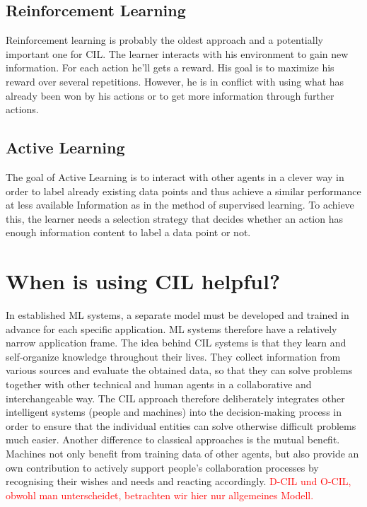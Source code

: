 \documentclass[conference,compsoc]{IEEEtran}
\newcommand\notes[1]{\textcolor{red}{#1}}
\begin{document}
\subsection{Reinforcement Learning}\label{reinforcement}
Reinforcement learning is probably the oldest approach and a potentially important one for CIL\@. 
The learner interacts with his environment to gain new information. For each action 
he'll gets a reward. His goal is to maximize his reward over several repetitions. 
However, he is in conflict with using what has already been won by his actions 
or to get more information through further actions.

\subsection{Active Learning}\label{active}
The goal of Active Learning is to interact with other agents in a clever way in order 
to label already existing data points and thus achieve a similar performance at less available 
Information as in the method of supervised learning. To achieve this, 
the learner needs a selection strategy\cite{ActiveToDedicated:calma} that decides whether 
an action has enough information content to label a data point or not.


\section{When is using CIL helpful?}\label{AdvantageOfCIL}
In established ML systems, a separate model must be developed and trained in advance for 
each specific application. ML systems therefore have a relatively narrow application frame. 
The idea behind CIL systems is that they learn and self-organize knowledge throughout their lives. 
They collect information from various sources and evaluate the obtained data, so that they 
can solve problems together with other technical and human agents in a 
collaborative and interchangeable way\cite{CIL:sick}.
The CIL approach therefore deliberately integrates other intelligent systems 
(people and machines) into the decision-making process in order to ensure that the individual entities 
can solve otherwise difficult problems much easier.
Another difference to classical approaches is the mutual benefit. 
Machines not only benefit from training data of other agents, but also provide 
an own contribution to actively support people's collaboration processes by 
recognising their wishes and needs and reacting accordingly\cite{CIL:sick}.
\notes{D-CIL und O-CIL, obwohl man unterscheidet, betrachten wir hier nur allgemeines Modell.}
\end{document}
